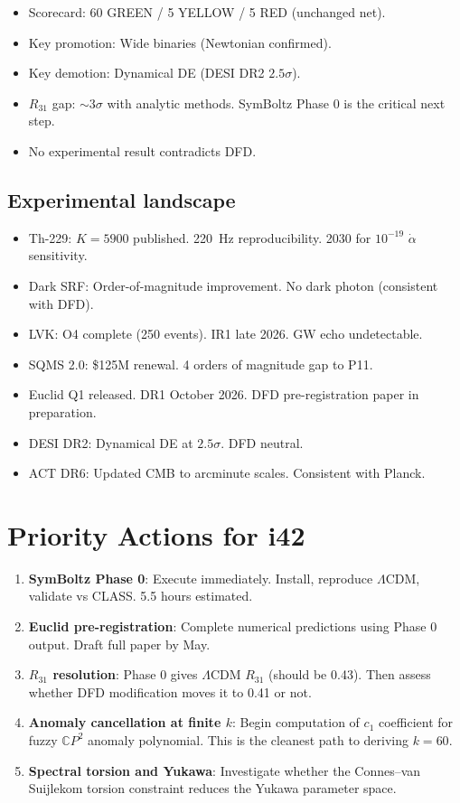 \documentclass[11pt,a4paper]{article}
\newcommand{\CP}{\mathbb{C}P}
\begin{document}
\begin{itemize}
\item Scorecard: 60 GREEN / 5 YELLOW / 5 RED (unchanged net).
\item Key promotion: Wide binaries (Newtonian confirmed).
\item Key demotion: Dynamical DE (DESI DR2 $2.5\sigma$).
\item $R_{31}$ gap: $\sim 3\sigma$ with analytic methods. SymBoltz Phase 0 is the critical next step.
\item No experimental result contradicts DFD.
\end{itemize}

\subsection{Experimental landscape}

\begin{itemize}
\item Th-229: $K = 5900$ published. 220~Hz reproducibility. 2030 for $10^{-19}$ $\dot\alpha$ sensitivity.
\item Dark SRF: Order-of-magnitude improvement. No dark photon (consistent with DFD).
\item LVK: O4 complete (250 events). IR1 late 2026. GW echo undetectable.
\item SQMS 2.0: \$125M renewal. 4 orders of magnitude gap to P11.
\item Euclid Q1 released. DR1 October 2026. DFD pre-registration paper in preparation.
\item DESI DR2: Dynamical DE at $2.5\sigma$. DFD neutral.
\item ACT DR6: Updated CMB to arcminute scales. Consistent with Planck.
\end{itemize}

\section{Priority Actions for i42}

\begin{enumerate}
\item \textbf{SymBoltz Phase 0}: Execute immediately. Install, reproduce $\Lambda$CDM, validate vs CLASS. 5.5 hours estimated.
\item \textbf{Euclid pre-registration}: Complete numerical predictions using Phase 0 output. Draft full paper by May.
\item \textbf{$R_{31}$ resolution}: Phase 0 gives $\Lambda$CDM $R_{31}$ (should be 0.43). Then assess whether DFD modification moves it to 0.41 or not.
\item \textbf{Anomaly cancellation at finite $k$}: Begin computation of $c_1$ coefficient for fuzzy $\CP^2$ anomaly polynomial. This is the cleanest path to deriving $k = 60$.
\item \textbf{Spectral torsion and Yukawa}: Investigate whether the Connes--van Suijlekom torsion constraint reduces the Yukawa parameter space.
\end{enumerate}
\end{document}

